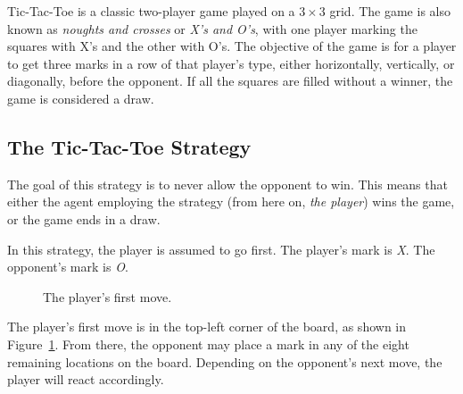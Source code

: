 
Tic-Tac-Toe is a classic two-player game played on a $3 \times 3$ grid.
The game is also known as \textit{noughts and crosses} or \textit{X's and O's},
with one player marking the squares with X's and the other with O's.
The objective of the game is for a player to get three marks in a row of that
player's type, either horizontally, vertically, or diagonally, before the
opponent.
If all the squares are filled without a winner, the game is considered a draw.

\subsection{The Tic-Tac-Toe Strategy}\label{subsec:the-tic-tac-toe-strategy}

The goal of this strategy is to never allow the opponent to win.
This means that either the agent employing the strategy
(from here on, \textit{the player}) wins the game, or the game ends in a draw.

In this strategy, the player is assumed to go first.
The player's mark is \textit{X}.
The opponent's mark is \textit{O}.

\begin{figure}
    \begin{center}
        \tictactoeboard{+}{ }{ }{ }{ }{ }{ }{ }{ }
    \end{center}
    \caption{The player's first move.}
    \label{fig:ttt-move-1}
\end{figure}

The player's first move is in the top-left corner of the board,
as shown in Figure~\ref{fig:ttt-move-1}.
From there, the opponent may place a mark in any of the eight remaining
locations on the board.
Depending on the opponent's next move, the player will react accordingly.

